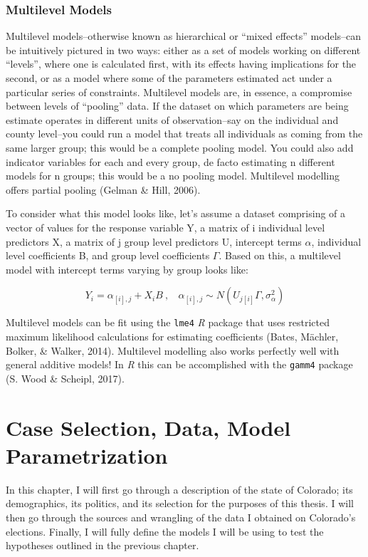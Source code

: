 \documentclass[12pt,twoside]{reedthesis}
\begin{document}
  \subsection{Multilevel Models}\label{multilevel-models}
  
  Multilevel models--otherwise known as hierarchical or ``mixed effects''
  models--can be intuitively pictured in two ways: either as a set of
  models working on different ``levels'', where one is calculated first,
  with its effects having implications for the second, or as a model where
  some of the parameters estimated act under a particular series of
  constraints. Multilevel models are, in essence, a compromise between
  levels of ``pooling'' data. If the dataset on which parameters are being
  estimate operates in different units of observation--say on the
  individual and county level--you could run a model that treats all
  individuals as coming from the same larger group; this would be a
  complete pooling model. You could also add indicator variables for each
  and every group, de facto estimating n different models for n groups;
  this would be a no pooling model. Multilevel modelling offers partial
  pooling (Gelman \& Hill, 2006).
  
  To consider what this model looks like, let's assume a dataset
  comprising of a vector of values for the response variable Y, a matrix
  of i individual level predictors X, a matrix of j group level predictors
  U, intercept terms \(\alpha\), individual level coefficients B, and
  group level coefficients \(\Gamma\). Based on this, a multilevel model
  with intercept terms varying by group looks like:
  
  \[Y_i = \alpha_{[i], j} + X_iB~,~~~~\alpha_{[i], j} \sim N(U_{j[i]}\Gamma, \sigma_{\alpha}^2)\]
  
  Multilevel models can be fit using the \texttt{lme4} \textit{R} package
  that uses restricted maximum likelihood calculations for estimating
  coefficients (Bates, Mächler, Bolker, \& Walker, 2014). Multilevel
  modelling also works perfectly well with general additive models! In
  \textit{R} this can be accomplished with the \texttt{gamm4} package (S.
  Wood \& Scheipl, 2017).
  
  \chapter{Case Selection, Data, Model
  Parametrization}\label{case-selection-data-model-parametrization}
  
  In this chapter, I will first go through a description of the state of
  Colorado; its demographics, its politics, and its selection for the
  purposes of this thesis. I will then go through the sources and
  wrangling of the data I obtained on Colorado's elections. Finally, I
  will fully define the models I will be using to test the hypotheses
  outlined in the previous chapter.
  
\end{document}
